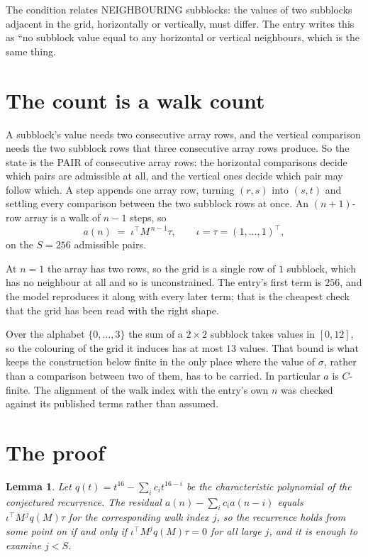 \documentclass[11pt,a4paper]{article}
\theoremstyle{plain}
\newtheorem{lemma}[theorem]{Lemma}
\theoremstyle{definition}
\begin{document}
The condition relates NEIGHBOURING subblocks: the values of two subblocks adjacent in the grid,
horizontally or vertically, must differ. The entry writes this as ``no subblock value equal to any horizontal or vertical neighbours, which is the same thing.

\section{The count is a walk count}

A subblock's value needs two consecutive array rows, and the vertical
comparison needs the two subblock rows that three consecutive array rows produce. So the state
is the PAIR of consecutive array rows: the horizontal comparisons decide which pairs are
admissible at all, and the vertical ones decide which pair may follow which. A step appends one
array row, turning $(r,s)$ into $(s,t)$ and settling every comparison between the two subblock
rows at once. An $(n+1)$-row array is a walk of $n-1$ steps, so
\[
a(n)\;=\;\iota^{\!\top}M^{\,n-1}\tau,\qquad\iota=\tau=(1,\dots,1)^{\!\top},
\]
on the $S=256$ admissible pairs.

At $n=1$ the array has two rows, so the grid is a single row of $1$
subblock, which has no neighbour at all and so is unconstrained. The
entry's first term is $256$, and the model reproduces it along with every later term; that
is the cheapest check that the grid has been read with the right shape.

Over the alphabet $\{0,\dots,3\}$ the sum of a $2\times2$ subblock takes values in
$[0,12]$, so the colouring of the grid it induces has at most $13$ values.
That bound is what keeps the construction below finite in the only place where the value of
$\sigma$, rather than a comparison between two of them, has to be carried.
In particular $a$ is $C$-finite. The alignment of the walk index with the entry's own $n$ was
checked against its published terms rather than assumed.

\section{The proof}

\begin{lemma}\label{lem:crit}
Let $q(t)=t^{16}-\sum_i c_it^{16-i}$ be the characteristic polynomial of the
conjectured recurrence. The residual $a(n)-\sum_ic_ia(n-i)$ equals
$\iota^{\!\top}M^{\,j}q(M)\tau$ for the corresponding walk index $j$, so the recurrence
holds from some point on if and only if $\iota^{\!\top}M^{j}q(M)\tau=0$ for all large $j$,
and it is enough to examine $j<S$.
\end{lemma}
\end{document}
